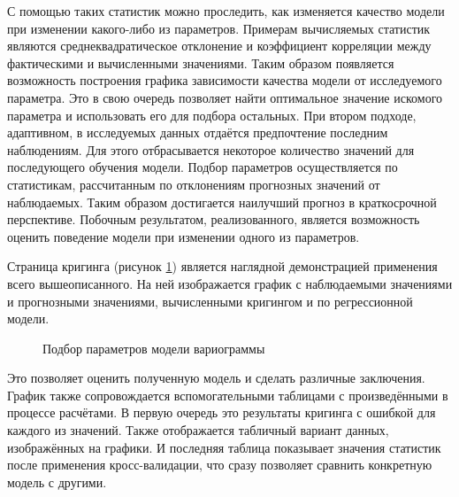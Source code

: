 С помощью таких статистик можно проследить, как изменяется качество модели при изменении какого-либо из параметров. Примерам вычисляемых статистик являются среднеквадратическое отклонение и коэффициент корреляции между фактическими и вычисленными значениями. Таким образом появляется возможность построения графика зависимости качества модели от исследуемого параметра. Это в свою очередь позволяет найти оптимальное значение искомого параметра и использовать его для подбора остальных. При втором подходе, адаптивном, в исследуемых данных отдаётся предпочтение последним наблюдениям. Для этого отбрасывается некоторое количество значений для последующего обучения модели. Подбор параметров осуществляется по статистикам, рассчитанным по отклонениям прогнозных значений от наблюдаемых. Таким образом достигается наилучший прогноз в краткосрочной перспективе. Побочным результатом, реализованного, является возможность оценить поведение модели при изменении одного из параметров.

Страница кригинга (рисунок \ref{img:mod_krige}) является наглядной демонстрацией применения всего вышеописанного. На ней изображается график с наблюдаемыми значениями и прогнозными значениями, вычисленными кригингом и по регрессионной модели.
\begin{figure}[ht]
\caption{Подбор параметров модели вариограммы}
\label{img:mod_krige}
\end{figure}
Это позволяет оценить полученную модель и сделать различные заключения. График также сопровождается вспомогательными таблицами с произведёнными в процессе расчётами. В первую очередь это результаты кригинга с ошибкой для каждого из значений. Также отображается табличный вариант данных, изображённых на графики. И последняя таблица показывает значения статистик после применения кросс-валидации, что сразу позволяет сравнить конкретную модель с другими.

